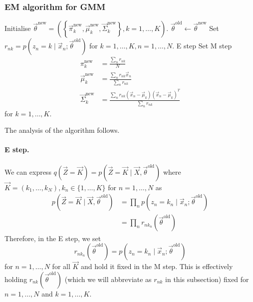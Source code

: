 \subsubsection{EM algorithm for GMM}
\begin{algorithmbis}\label{alg:models-mm-em-gmm}
    \begin{algorithmic}[1]
        \State Initialise $\vec \theta^{\text{new}} = \left(\left\{\vec \pi_k^{\text{new}}, \vec \mu_k^{\text{new}}, \vec \Sigma_k^{\text{new}}\right\}, k = 1, \dotsc, K\right)$.
        \Repeat
            \State $\vec \theta^{\text{old}} \gets \vec \theta^{\text{new}}$
            \State Set $r_{nk} = p\left(z_n = k \mid \vec x_n; \vec \theta^{\text{old}}\right)$ for $k = 1, \dotsc, K, n = 1, \dotsc, N$. \Comment E step
            \State Set \Comment M step
                \begin{align*}
                    \pi_k^{\text{new}}           &= \frac{\sum_n r_{nk}}{N} \\
                    \vec \mu_k^{\text{new}}      &= \frac{\sum_n r_{nk} \vec x_n}{\sum_n r_{nk}} \\
                    \vec \Sigma_k^{\text{new}}   &= \frac{\sum_n r_{nk}(\vec x_n - \vec \mu_k)(\vec x_n - \vec \mu_k)^T}{\sum_n r_{nk}}
                \end{align*}
                for $k = 1, \dotsc, K$.
    \end{algorithmic}
\end{algorithmbis}

The analysis of the algorithm follows.
\paragraph{E step.} We can express $q(\vec Z = \vec K) = p(\vec Z = \vec K \mid \vec X, \vec \theta^{\text{old}})$ where $\vec K = (k_1, \dotsc, k_N), k_n \in \{1, \dotsc, K\}$ for $n =  1, \dotsc, N$ as
\begin{align*}
    p(\vec Z = \vec K \mid \vec X, \vec \theta^{\text{old}})    &= \prod_n p\left(z_n = k_n \mid \vec x_n; \vec \theta^{\text{old}}\right) \\
                                                                &= \prod_n r_{nk_n}\left(\vec \theta^{\text{old}}\right)
\end{align*}
Therefore, in the E step, we set
\begin{equation}
    r_{nk_n}\left(\vec \theta^{\text{old}}\right) = p\left(z_n = k_n \mid \vec x_n; \vec \theta^{\text{old}}\right)
\end{equation}
for $n = 1, \dotsc, N$ for all $\vec K$ and hold it fixed in the M step. This is effectively holding $r_{nk}\left(\vec \theta^{\text{old}}\right)$ (which we will abbreviate as $r_{nk}$ in this subsection) fixed for $n = 1, \dotsc, N$ and $k = 1, \dotsc, K$.

